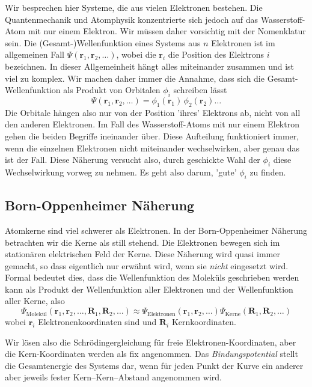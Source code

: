 Wir besprechen hier Systeme, die  aus vielen Elektronen bestehen. Die Quantenmechanik und Atomphysik konzentrierte sich jedoch auf das Wasserstoff-Atom mit nur einem Elektron. Wir müssen daher vorsichtig mit der Nomenklatur sein. Die (Gesamt-)Wellenfunktion eines Systems aus $n$ Elektronen ist im allgemeinen Fall $\Psi(\mathbf{r}_1, \mathbf{r}_2, \dots)$, wobei die $\mathbf{r}_i$ die Position des Elektrons $i$ bezeichnen. In dieser Allgemeinheit hängt alles miteinander zusammen und ist viel zu komplex. Wir machen daher immer die Annahme, dass sich die Gesamt-Wellenfunktion als Produkt von Orbitalen $\phi_i$ schreiben lässt
\begin{equation}
\Psi(\mathbf{r}_1, \mathbf{r}_2, \dots) = \phi_1(\mathbf{r}_1) \, \phi_2(\mathbf{r}_2)  \dots
\end{equation}
Die Orbitale hängen also nur von der Position 'ihres' Elektrons ab, nicht von all den anderen Elektronen. Im Fall des Wasserstoff-Atoms mit nur einem Elektron gehen die beiden Begriffe ineinander über.
Diese Aufteilung funktioniert immer, wenn die einzelnen Elektronen nicht miteinander wechselwirken, aber genau das ist der Fall. Diese Näherung versucht also, durch geschickte Wahl der $\phi_i$ diese Wechselwirkung vorweg zu nehmen. Es geht also darum, 'gute' $\phi_i$ zu finden.

\subsection{Born-Oppenheimer Näherung}

Atomkerne sind viel schwerer als Elektronen. In der Born-Oppenheimer Näherung betrachten wir die Kerne als still stehend. Die Elektronen bewegen sich im stationären elektrischen Feld der Kerne. Diese Näherung wird quasi immer gemacht, so dass eigentlich nur erwähnt wird, wenn sie \emph{nicht} eingesetzt wird. Formal bedeutet dies, dass die Wellenfunktion des Moleküls geschrieben werden kann als Produkt der Wellenfunktion aller Elektronen und der Wellenfunktion aller Kerne, also
\begin{equation}
\Psi_{\text{Molekül}}(\mathbf{r}_1, \mathbf{r}_2, \dots, \mathbf{R}_1, \mathbf{R}_2, \dots)
  \approx
  \Psi_{\text{Elektronen}}(\mathbf{r}_1, \mathbf{r}_2, \dots )
\Psi_{\text{Kerne}}( \mathbf{R}_1, \mathbf{R}_2, \dots)
\end{equation}
wobei $\mathbf{r}_i$ Elektronenkoordinaten sind und $\mathbf{R}_i$ Kernkoordinaten.


Wir lösen also die Schrödingergleichung für freie Elektronen-Koordinaten, aber die Kern-Koordinaten werden als fix angenommen. Das \emph{Bindungspotential} stellt die Gesamtenergie des Systems dar, wenn für jeden Punkt der Kurve ein anderer aber jeweils fester Kern--Kern--Abstand angenommen wird.


